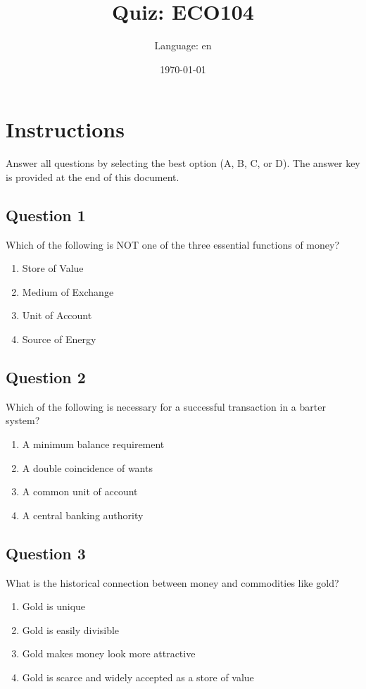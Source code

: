 \documentclass[12pt,a4paper]{article}
\title{Quiz: ECO104}
\author{Language: en}
\date{\today}
\begin{document}
\maketitle
\thispagestyle{fancy}

\section*{Instructions}
Answer all questions by selecting the best option (A, B, C, or D). The answer key is provided at the end of this document.

\bigskip


\subsection*{Question 1}
Which of the following is NOT one of the three essential functions of money?

\begin{enumerate}[label=\Alph*., leftmargin=*]
\item Store of Value
\item Medium of Exchange
\item Unit of Account
\item Source of Energy
\end{enumerate}

\bigskip


\subsection*{Question 2}
Which of the following is necessary for a successful transaction in a barter system?

\begin{enumerate}[label=\Alph*., leftmargin=*]
\item A minimum balance requirement
\item A double coincidence of wants
\item A common unit of account
\item A central banking authority
\end{enumerate}

\bigskip


\subsection*{Question 3}
What is the historical connection between money and commodities like gold?

\begin{enumerate}[label=\Alph*., leftmargin=*]
\item Gold is unique
\item Gold is easily divisible
\item Gold makes money look more attractive
\item Gold is scarce and widely accepted as a store of value
\end{enumerate}
\end{document}
